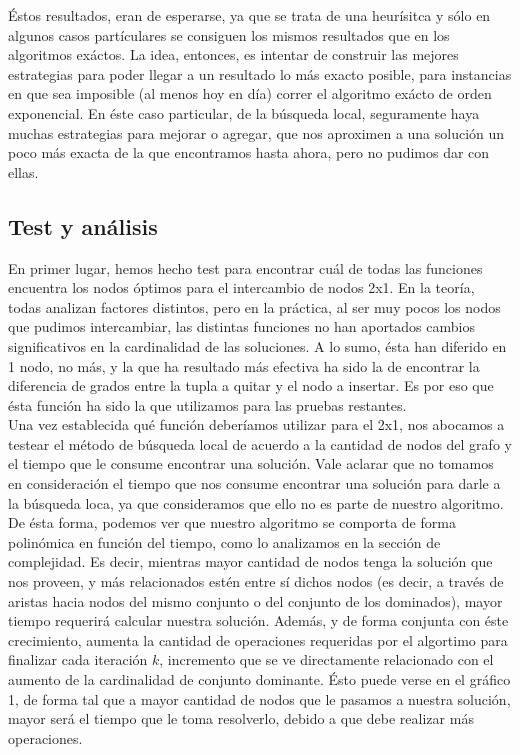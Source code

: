 Éstos resultados, eran de esperarse, ya que se trata de una heurísitca y sólo en algunos casos partículares se consiguen los mismos resultados que en los algoritmos exáctos. La idea, entonces, es intentar de construir las mejores estrategias para poder llegar a un resultado lo más exacto posible, para instancias en que sea imposible (al menos hoy en día) correr el algoritmo exácto de orden exponencial. En éste caso particular, de la búsqueda local, seguramente haya muchas estrategias para mejorar o agregar, que nos aproximen a una solución un poco más exacta de la que encontramos hasta ahora, pero no pudimos dar con ellas.


\subsection{Test y análisis}
En primer lugar, hemos hecho test para encontrar cuál de todas las funciones encuentra los nodos óptimos para el intercambio de nodos 2x1. En la teoría, todas analizan factores distintos, pero en la práctica, al ser muy pocos los nodos que pudimos intercambiar, las distintas funciones no han aportados cambios significativos en la cardinalidad de las soluciones. A lo sumo, ésta han diferido en 1 nodo, no más, y la que ha resultado más efectiva ha sido la de encontrar la diferencia de grados entre la tupla a quitar y el nodo a insertar. Es por eso que ésta función ha sido la que utilizamos para las pruebas restantes. \\
Una vez establecida qué función deberíamos utilizar para el 2x1, nos abocamos a testear el método de búsqueda local de acuerdo a la cantidad de nodos del grafo y el tiempo que le consume encontrar una solución. Vale aclarar que no tomamos en consideración el tiempo que nos consume encontrar una solución para darle a la búsqueda loca, ya que consideramos que ello no es parte de nuestro algoritmo. De ésta forma, podemos ver que nuestro algoritmo se comporta de forma polinómica en función del tiempo, como lo analizamos en la sección de complejidad. Es decir, mientras mayor cantidad de nodos tenga la solución que nos proveen, y más relacionados estén entre sí dichos nodos (es decir, a través de aristas hacia nodos del mismo conjunto o del conjunto de los dominados), mayor tiempo requerirá calcular nuestra solución. Además, y de forma conjunta con éste crecimiento, aumenta la cantidad de operaciones requeridas por el algortimo para finalizar cada iteración $k$, incremento que se ve directamente relacionado con el aumento de la cardinalidad de conjunto dominante. Ésto puede verse en el gráfico 1, de forma tal que a mayor cantidad de nodos que le pasamos a nuestra solución, mayor será el tiempo que le toma resolverlo, debido a que debe realizar más operaciones.

